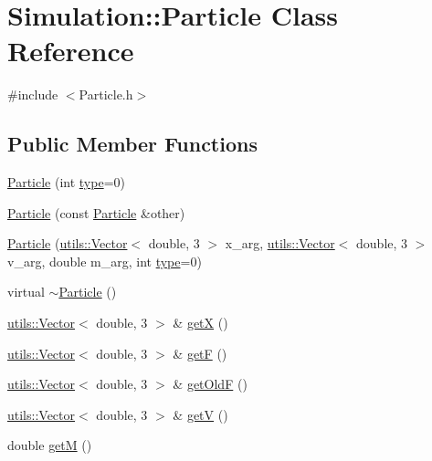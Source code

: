 \hypertarget{classSimulation_1_1Particle}{\section{Simulation\-:\-:Particle Class Reference}
\label{classSimulation_1_1Particle}
}


{\ttfamily \#include $<$Particle.\-h$>$}

\subsection*{Public Member Functions}
\begin{DoxyCompactItemize}
\item 
\hyperlink{classSimulation_1_1Particle_a866812d3dfb9c539e5e24593e596a8c9}{Particle} (int \hyperlink{classtype}{type}=0)
\item 
\hyperlink{classSimulation_1_1Particle_a24b04cb7c6f7ea4242d25c410f44ae56}{Particle} (const \hyperlink{classSimulation_1_1Particle}{Particle} \&other)
\item 
\hyperlink{classSimulation_1_1Particle_a5a5b07aa732c302b45e90c12723f2b27}{Particle} (\hyperlink{classutils_1_1Vector}{utils\-::\-Vector}$<$ double, 3 $>$ x\-\_\-arg, \hyperlink{classutils_1_1Vector}{utils\-::\-Vector}$<$ double, 3 $>$ v\-\_\-arg, double m\-\_\-arg, int \hyperlink{classtype}{type}=0)
\item 
virtual \hyperlink{classSimulation_1_1Particle_ad030d0fe7b88cf81744b127c99244ff4}{$\sim$\-Particle} ()
\item 
\hyperlink{classutils_1_1Vector}{utils\-::\-Vector}$<$ double, 3 $>$ \& \hyperlink{classSimulation_1_1Particle_ab7ade5dc156dfa0234aa0323564e46ed}{get\-X} ()
\item 
\hyperlink{classutils_1_1Vector}{utils\-::\-Vector}$<$ double, 3 $>$ \& \hyperlink{classSimulation_1_1Particle_acd84c445e2bd5f5280a00e76cfe73fe0}{get\-F} ()
\item 
\hyperlink{classutils_1_1Vector}{utils\-::\-Vector}$<$ double, 3 $>$ \& \hyperlink{classSimulation_1_1Particle_a1204435fc08c697b0fea230616d1bbdf}{get\-Old\-F} ()
\item 
\hyperlink{classutils_1_1Vector}{utils\-::\-Vector}$<$ double, 3 $>$ \& \hyperlink{classSimulation_1_1Particle_aaf3ecbc6e1e31b259fe239461ba13dbd}{get\-V} ()
\item 
double \hyperlink{classSimulation_1_1Particle_aa1ca800f9be9dd4bd6c604f608095b24}{get\-M} ()
\item 

\end{DoxyCompactItemize}
